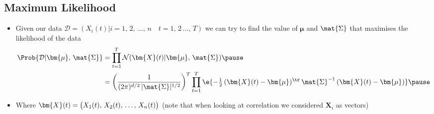 \begin{slide}
\section{Maximum Likelihood}

\begin{PauseHighLight}
  \begin{itemize}
  \item Given our data $\mathcal{D}=\left(X_i(t) \big|
      i=1,\,2,\,\ldots,\,n\quad t=1,\,2\,\ldots,\, T\right)$ we can try
    to find the value of $\bm{\mu}$ and $\mat{\Sigma}$ that maximises
    the likelihood of the data
    \begin{align*}
      \Prob{\mathcal{D}| \bm{\mu},\,\mat{\Sigma}} &=
      \prod_{t=1}^T \mathcal{N}(\bm{X}(t) | \bm{\mu},\,\mat{\Sigma})\pause \\
      &= \left(\frac{1}{(2\pi)^{d/2}\,|\mat{\Sigma}|^{1/2}}\right)^T
        \prod_{t=1}^T \e{-\tfrac{1}{2}\,(\bm{X}(t)-\bm{\mu})^\tr
      \,\mat{\Sigma}^{-1} \,(\bm{X}(t)-\bm{\mu})}\pause
    \end{align*} 
  \item Where $\bm{X}(t) = \left(\strut
      X_1(t),\,X_2(t),\,\ldots,\,X_n(t)\right)$ (note that when looking
    at correlation we considered $\bm{X}_i$ as vectors)\pause
  \end{itemize}
\end{PauseHighLight}

\end{slide}


